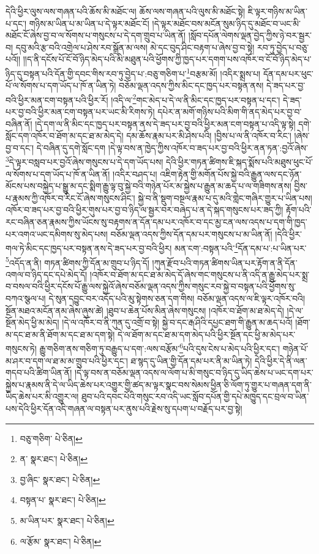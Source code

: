 དེའི་ཕྱིར་ལུས་ལས་གཞན་པའི་ཆོས་མི་མཐོང་ལ། ཆོས་ལས་གཞན་པའི་ལུས་མི་མཐོང་སྟེ། ཇི་ལྟར་གཉིས་མ་ཡིན་པ་དང་། གཉིས་མ་ཡིན་པ་མ་ཡིན་པ་དེ་ལྟར་མཐོང་ངོ། །དེ་ལྟར་མཐོང་བས་མངོན་སུམ་ཉིད་དུ་མཐོང་བ་ཡང་མི་མཐོང་ངོ་ཞེས་བྱ་བ་ལ་སོགས་པ་གསུངས་པ་དེ་དག་གྲུབ་པ་ཡིན་ནོ། །སློབ་དཔོན་ལེགས་ལྡན་བྱེད་ཀྱིས་ཉེ་བར་སྦྱར་བ། དབུ་མའི་རྩ་བའི་འགྲེལ་པ་ཤེས་རབ་སྒྲོན་མ་ལས། མེ་དང་བུད་ཤིང་བརྟག་པ་ཞེས་བྱ་བ་སྟེ། རབ་ཏུ་བྱེད་པ་བཅུ་པའོ།། །།ད་ནི་དངོས་པོ་ངོ་བོ་ཉིད་མེད་པའི་མི་མཐུན་པའི་ཕྱོགས་ཀྱི་ཁྱད་པར་དགག་པས་འཁོར་བ་ངོ་བོ་ཉིད་མེད་པ་ཉིད་དུ་བསྟན་པའི་དོན་གྱི་དབང་གིས་རབ་ཏུ་བྱེད་པ་:བཅུ་གཅིག་པ་\footnote{བཅུ་གཅིག་  པེ་ཅིན། }བརྩམ་མོ། །འདིར་སྨྲས་པ། དོན་དམ་པར་ཕུང་པོ་ལ་སོགས་པ་དག་ཡོད་པ་ཁོ་ན་ཡིན་ཏེ། བཅོམ་ལྡན་འདས་ཀྱིས་མིང་དང་ཁྱད་པར་བསྟན་ནས། དེ་ཟད་པར་བྱ་བའི་ཕྱིར་མན་ངག་བསྟན་པའི་ཕྱིར་རོ། །འདི་ལ་\footnote{ན་  སྣར་ཐང་།  པེ་ཅིན། }གང་མེད་པ་དེ་ལ་ནི་མིང་དང་ཁྱད་པར་བསྟན་པ་དང་། དེ་ཟད་པར་བྱ་བའི་ཕྱིར་མན་ངག་བསྟན་པར་ཡང་མི་རིགས་ཏེ། དཔེར་ན་མགོ་གཉིས་པའི་མིག་གི་ནད་མེད་པར་བྱ་བ་བཞིན་ནོ། །དེ་དག་ལ་ནི་མིང་དང་ཁྱད་པར་བསྟན་ནས་དེ་ཟད་པར་བྱ་བའི་ཕྱིར་མན་ངག་བསྟན་པ་འདི་ལྟ་སྟེ། དགེ་སློང་དག་འཁོར་བ་ཐོག་མ་དང་ཐ་མ་མེད་དེ། དམ་ཆོས་རྣམ་པར་མི་ཤེས་པའི། །བྱིས་པ་ལ་ནི་འཁོར་བ་རིང་། །ཞེས་བྱ་བ་དང་། དེ་བཞིན་དུ་དགེ་སློང་དག །དེ་ལྟ་བས་ན་ཁྱེད་ཀྱིས་འཁོར་བ་ཟད་པར་བྱ་བའི་ཕྱིར་ནན་ཏན་:བྱའོ་ཞེས་\footnote{བྱ་ཞིང་  སྣར་ཐང་།  པེ་ཅིན། }དེ་ལྟར་བསླབ་པར་བྱའོ་ཞེས་གསུངས་པ་དེ་དག་ཡོད་པས། དེའི་ཕྱིར་གཏན་ཚིགས་ཇི་སྐད་སྨོས་པའི་མཐུས་ཕུང་པོ་ལ་སོགས་པ་དག་ཡོད་པ་ཁོ་ན་ཡིན་ནོ། །འདིར་བཤད་པ། འཇིག་རྟེན་གྱི་མགོན་པོས་སྐྱེ་བའི་རྒྱུན་ལས་དང་ཉོན་མོངས་པས་བསྐྱེད་པ་སྒྱུ་མ་དང་སྨིག་རྒྱུ་ལྟ་བུ་སྐྱེ་བའི་གཉེན་པོར་མ་སྐྱེས་པ་རྒྱུན་མ་ཆད་པ་ལ་གཟིགས་ནས། བྱིས་པ་རྣམས་ཀྱི་འཁོར་བ་རིང་ངོ་ཞེས་གསུངས་ཤིང་། སྐྱེ་བ་ནི་སྡུག་བསྔལ་རྣམ་པ་དུ་མའི་གླེང་གཞིར་གྱུར་པ་ཡིན་པས། འཁོར་བ་ཟད་པར་བྱ་བའི་ཕྱིར་གུས་པར་བྱ་བ་ཉིད་ལ་སྦྱར་བར་བཞེད་པ་ན་དེ་སྐད་གསུངས་པར་ཟད་ཀྱི། རྟོག་པའི་རང་བཞིན་ཅན་རྣམས་ཀྱིས་ཡོངས་སུ་བརྟགས་ན་དོན་དམ་པར་འཁོར་བ་དང་མྱ་ངན་ལས་འདས་པ་དག་གི་ཁྱད་པར་འགའ་ཡང་དམིགས་སུ་མེད་པས། བཅོམ་ལྡན་འདས་ཀྱིས་དོན་དམ་པར་གསུངས་པ་མ་ཡིན་ནོ། །དེའི་ཕྱིར་གལ་ཏེ་མིང་དང་ཁྱད་པར་བསྟན་ནས་དེ་ཟད་པར་བྱ་བའི་ཕྱིར། མན་ངག་:བསྟན་པའི་\footnote{བསྟན་པ་  སྣར་ཐང་།  པེ་ཅིན། }དོན་དམ་པ་:པ་ཡིན་པར་\footnote{མ་ཡིན་པར་  སྣར་ཐང་།  པེ་ཅིན། }འདོད་ན་ནི། གཏན་ཚིགས་ཀྱི་དོན་མ་གྲུབ་པ་ཉིད་དོ། །ཀུན་རྫོབ་པའི་གཏན་ཚིགས་ཡིན་པར་རྟོག་ན་ནི་དོན་འགལ་བ་ཉིད་དང་དཔེ་མེད་དོ། །འཁོར་བ་ཐོག་མ་དང་ཐ་མ་མེད་དོ་ཞེས་གང་གསུངས་པ་ནི་འདི་ན་རྒྱུ་མེད་པར་སྨྲ་བ་བསལ་བའི་ཕྱིར་དངོས་པོ་རྒྱུ་ལས་སྐྱེའོ་ཞེས་བཅོམ་ལྡན་འདས་ཀྱིས་གསུང་རབ་སྐྱེ་བ་བསྟན་པའི་ཕྱོགས་སུ་བཀའ་སྩལ་པ། དེ་སུན་དབྱུང་བར་འདོད་པའི་མུ་སྟེགས་ཅན་དག་གིས། བཅོམ་ལྡན་འདས་ལ་ཇི་ལྟར་འཁོར་བའི། སྔོན་མཐའ་མངོན་ནམ་ཞེས་ཞུས་ཚེ། །ཐུབ་པ་ཆེན་པོས་མིན་ཞེས་གསུངས། །འཁོར་བ་ཐོག་མ་ཐ་མེད་དེ། །དེ་ལ་སྔོན་མེད་ཕྱི་མ་མེད། །དེ་ལ་འཁོར་བ་ནི་ཀུན་དུ་འགྲོ་བ་སྟེ། སྐྱེ་བ་དང་རྒ་ཤིའི་དཔྱང་ཐག་གི་རྒྱུན་མ་ཆད་པའོ། །ཐོག་མ་དང་ཐ་མ་ནི་ཐོག་མ་དང་ཐ་མ་དག་སྟེ། དེ་ལ་ཐོག་མ་དང་ཐ་མ་དག་མེད་པའི་ཕྱིར་སྔོན་དང་ཕྱི་མ་མེད་པར་གསུངས་ཏེ། རྒྱུ་གཅིག་ནས་གཅིག་ཏུ་བརྒྱུད་པ་དག་:ལས་བརྩོམ་\footnote{ལ་རྩོམ་  སྣར་ཐང་།  པེ་ཅིན། }པའི་དུས་ངེས་པ་མེད་པའི་ཕྱིར་དང་། གཉེན་པོ་མ་ཤར་བ་དག་ལ་ཐ་མ་མ་གྲུབ་པའི་ཕྱིར་དང་། ཐ་སྙད་དུ་ཡིན་གྱི་དོན་དམ་པར་ནི་མ་ཡིན་ཏེ། དེའི་ཕྱིར་དེ་ནི་ལན་གདབ་པའི་ཚིག་ཡིན་ནོ། །དེ་ལྟ་བས་ན་བཅོམ་ལྡན་འདས་ལ་ལོག་པ་མི་གསུང་བ་ཉིད་དུ་ཡིད་ཆེས་པ་ཡང་དག་པར་སྐྱེས་པ་རྣམས་ནི་དེ་ལ་ཡིད་ཆེས་པར་འགྱུར་གྱི་ཚད་མ་ལྟར་སྣང་བས་སེམས་ཕྱིན་ཅི་ལོག་ཏུ་གྱུར་པ་གཞན་དག་ནི་ཡིད་ཆེས་པར་མི་འགྱུར་ལ། ཐུབ་པའི་དབང་པོའི་གསུང་རབ་འདི་ཡང་སློབ་དཔོན་གྱི་དཔེ་མཁྱུད་དང་བྲལ་བ་ཡིན་པས་དེའི་ཕྱིར་དོན་འདི་གཞན་ལ་བསྟན་པར་ནུས་པའི་རྗེས་སུ་དཔག་པ་བརྗོད་པར་བྱ་སྟེ། 